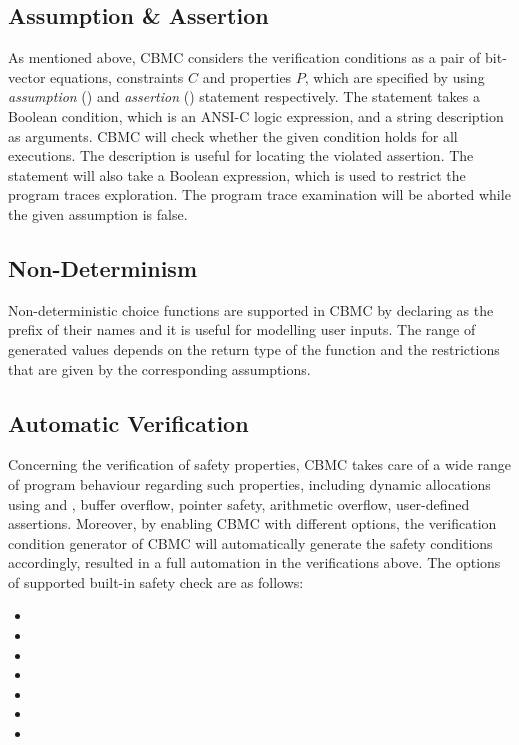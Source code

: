 \subsection{Assumption \& Assertion}
As mentioned above, CBMC considers the verification conditions as a pair of bit-vector equations, constraints $C$ and properties $P$, which are specified by using \textit{assumption} () and \textit{assertion} () statement respectively. The  statement takes a Boolean condition, which is an ANSI-C logic expression, and a string description as arguments. CBMC will check whether the given condition holds for all executions. The description is useful for locating the violated assertion. The  statement will also take a Boolean expression, which is used to restrict the program traces exploration. The program trace examination will be aborted while the given assumption is false.

\subsection{Non-Determinism}
Non-deterministic choice functions are supported in CBMC by declaring  as the prefix of their names and it is useful for modelling user inputs. The range of generated values depends on the return type of the function and the restrictions that are given by the corresponding assumptions. 

\subsection{Automatic Verification} \label{subsec:av}
Concerning the verification of safety properties, CBMC takes care of a wide range of program behaviour regarding such properties, including dynamic allocations using  and , buffer overflow, pointer safety, arithmetic overflow, user-defined assertions. Moreover, by enabling CBMC with different options, the verification condition generator of CBMC will automatically generate the safety conditions accordingly, resulted in a full automation in the verifications above. The options of supported built-in safety check are as follows:

\begin{multicols}{2}
\begin{itemize}[nosep, label={}]
    \item {}
    \item {}
    \item {}
    \item {}
    \item {}
    \item {}
    \item {}
\end{itemize}
\end{multicols}

